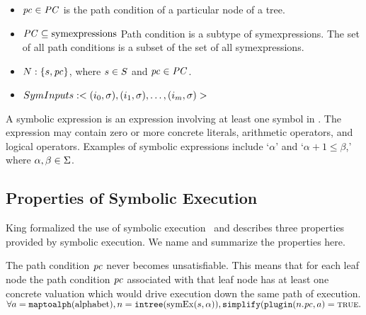 \begin{itemize}
\item $\mathit{pc} \in \mathit{PC}$ is the path condition of a particular node of a tree.
\item $\mathit{PC} \subseteq \mathrm{symexpressions}$ Path condition is a subtype of
  symexpressions. The set of all path conditions is a subset of the set of all
  symexpressions.
\item $N: \{s,\mathit{pc}\}$, where $s \in S$
  and $\mathit{pc} \in \mathit{PC}$.
\item $SymInputs: <(i_0, \sigma), (i_1,
  \sigma), \ldots, (i_m, \sigma)>$
\end{itemize}

A symbolic expression \symexpression{} is an expression involving at least one
symbol in \symalphabet. The expression may contain zero or more concrete
literals, arithmetic operators, and logical operators.  Examples of
symbolic expressions include `$\alpha$' and `$\alpha + 1 \le \beta$,' where $\alpha,
\beta \in \Sigma$.



\subsection{Properties of Symbolic Execution}
King formalized the use of symbolic execution~\cite{king1976symbolic} and describes three
properties provided by symbolic execution. We name and summarize the properties
here.
\setcounter{property}{0}
\renewcommand{\theproperty}{K.\arabic{property}}
\begin{property}
  \label{prop:kingsound}
  The path condition $\mathit{pc}$ never becomes unsatisfiable. This means that for each
  leaf node the path condition $\mathit{pc}$ associated with that leaf node has at
  least one concrete valuation which would drive execution down the same path of
  execution.
  $
  \forall a = \mathtt{maptoalph}(\mathrm{alphabet}),  n =
\mathtt{intree}(\mathrm{symEx}(s,\alpha)),
\mathtt{simplify}(\mathtt{plugin}(n.\mathit{pc},a) = \mathtt{\textsc{true}}.
  $
  
\end{property}


